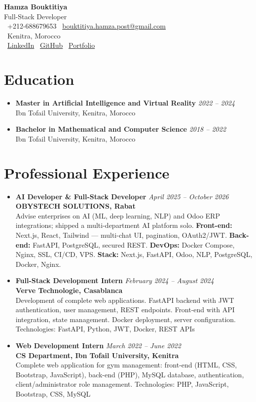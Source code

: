 \documentclass[10pt,a4paper]{article}
\newcommand{\cvheader}[4]{
    \begin{center}
        {\Huge\bfseries #1}\\[0.1em]
        {\large #2}\\[0.1em]
        \faPhone\ #3 \quad \faEnvelope\ \href{mailto:#4}{#4}\\[0.1em]
        \faMapMarker\ Kenitra, Morocco\\[0.1em]
        \faLinkedin\ \href{https://www.linkedin.com/in/hamza-bouktitiya-604471253/}{LinkedIn} \quad
        \faGithub\ \href{https://github.com/gothamza}{GitHub} \quad
        \faGlobe\ \href{https://gothamza.github.io/portfolio/}{Portfolio}
    \end{center}
    \vspace{-0.3em}
}
\newcommand{\cvitem}[2]{\textbf{#1} \hfill \textit{#2}}
\begin{document}
\cvheader{Hamza Bouktitiya}{Full-Stack Developer}{+212-688679653}{bouktitiya.hamza.post@gmail.com}

\section*{Education}
\begin{itemize}
    \item \cvitem{Master in Artificial Intelligence and Virtual Reality}{2022 -- 2024}\\
    Ibn Tofail University, Kenitra, Morocco
    \item \cvitem{Bachelor in Mathematical and Computer Science}{2018 -- 2022}\\
    Ibn Tofail University, Kenitra, Morocco
\end{itemize}

\section*{Professional Experience}
\begin{itemize}
    \item \cvitem{AI Developer \& Full-Stack Developer}{April 2025 -- October 2026}\\
    \textbf{OBYSTECH SOLUTIONS, Rabat}\\
    Advise enterprises on AI (ML, deep learning, NLP) and Odoo ERP integrations; shipped a multi-department AI platform solo. \textbf{Front-end:} Next.js, React, Tailwind --- multi-chat UI, pagination, OAuth2/JWT. \textbf{Back-end:} FastAPI, PostgreSQL, secured REST. \textbf{DevOps:} Docker Compose, Nginx, SSL, CI/CD, VPS. \textbf{Stack:} Next.js, FastAPI, Odoo, NLP, PostgreSQL, Docker, Nginx.
    \item \cvitem{Full-Stack Development Intern}{February 2024 -- August 2024}\\
    \textbf{Verve Technologie, Casablanca}\\
    Development of complete web applications. FastAPI backend with JWT authentication, user management, REST endpoints. Front-end with API integration, state management. Docker deployment, server configuration. Technologies: FastAPI, Python, JWT, Docker, REST APIs
    \item \cvitem{Web Development Intern}{March 2022 -- June 2022}\\
    \textbf{CS Department, Ibn Tofail University, Kenitra}\\
    Complete web application for gym management: front-end (HTML, CSS, Bootstrap, JavaScript), back-end (PHP), MySQL database, authentication, client/administrator role management. Technologies: PHP, JavaScript, Bootstrap, CSS, MySQL
\end{itemize}
\end{document}
